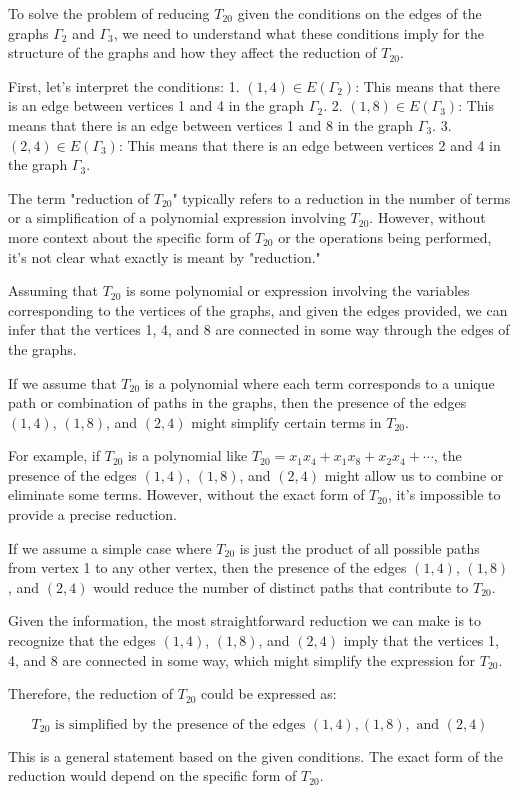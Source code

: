 To solve the problem of reducing \( T_{20} \) given the conditions on the edges of the graphs \(\Gamma_2\) and \(\Gamma_3\), we need to understand what these conditions imply for the structure of the graphs and how they affect the reduction of \( T_{20} \).

First, let's interpret the conditions:
1. \((1,4) \in E(\Gamma_2)\): This means that there is an edge between vertices 1 and 4 in the graph \(\Gamma_2\).
2. \((1,8) \in E(\Gamma_3)\): This means that there is an edge between vertices 1 and 8 in the graph \(\Gamma_3\).
3. \((2,4) \in E(\Gamma_3)\): This means that there is an edge between vertices 2 and 4 in the graph \(\Gamma_3\).

The term "reduction of \( T_{20} \)" typically refers to a reduction in the number of terms or a simplification of a polynomial expression involving \( T_{20} \). However, without more context about the specific form of \( T_{20} \) or the operations being performed, it's not clear what exactly is meant by "reduction."

Assuming that \( T_{20} \) is some polynomial or expression involving the variables corresponding to the vertices of the graphs, and given the edges provided, we can infer that the vertices 1, 4, and 8 are connected in some way through the edges of the graphs.

If we assume that \( T_{20} \) is a polynomial where each term corresponds to a unique path or combination of paths in the graphs, then the presence of the edges \((1,4)\), \((1,8)\), and \((2,4)\) might simplify certain terms in \( T_{20} \).

For example, if \( T_{20} \) is a polynomial like \( T_{20} = x_1 x_4 + x_1 x_8 + x_2 x_4 + \cdots \), the presence of the edges \((1,4)\), \((1,8)\), and \((2,4)\) might allow us to combine or eliminate some terms. However, without the exact form of \( T_{20} \), it's impossible to provide a precise reduction.

If we assume a simple case where \( T_{20} \) is just the product of all possible paths from vertex 1 to any other vertex, then the presence of the edges \((1,4)\), \((1,8)\), and \((2,4)\) would reduce the number of distinct paths that contribute to \( T_{20} \).

Given the information, the most straightforward reduction we can make is to recognize that the edges \((1,4)\), \((1,8)\), and \((2,4)\) imply that the vertices 1, 4, and 8 are connected in some way, which might simplify the expression for \( T_{20} \).

Therefore, the reduction of \( T_{20} \) could be expressed as:

\[
\boxed{T_{20} \text{ is simplified by the presence of the edges } (1,4), (1,8), \text{ and } (2,4)}
\]

This is a general statement based on the given conditions. The exact form of the reduction would depend on the specific form of \( T_{20} \).